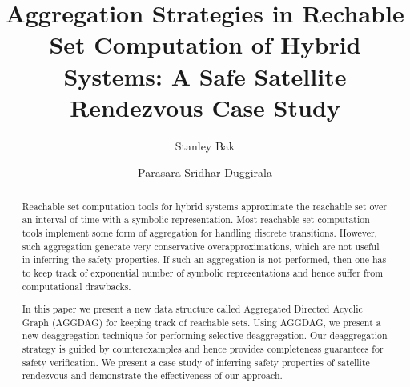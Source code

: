 \documentclass[runningheads]{llncs}
\begin{document}
%
\title{Aggregation Strategies in Rechable Set Computation of Hybrid Systems: A Safe Satellite Rendezvous Case Study}
%
%
\author{Stanley Bak \and
Parasara Sridhar Duggirala}
%
% 
%
%
\maketitle              %
%
\begin{abstract}
Reachable set computation tools for hybrid systems approximate the reachable set over an interval of time with a symbolic representation. 
Most reachable set computation tools implement some form of aggregation for handling discrete transitions. However, such aggregation generate very conservative overapproximations, which are not useful in inferring the safety properties. If such an aggregation is not performed, then one has to keep track of exponential number of symbolic representations and hence suffer from computational drawbacks.

In this paper we present a new data structure called Aggregated Directed Acyclic Graph (AGGDAG) for keeping track of reachable sets. Using AGGDAG, we present a new deaggregation technique for performing selective deaggregation. Our deaggregation strategy is guided by counterexamples and hence provides completeness guarantees for safety verification. We present a case study of inferring safety properties of satellite rendezvous and demonstrate the effectiveness of our approach.




\end{abstract}
%
%
%








\end{document}
